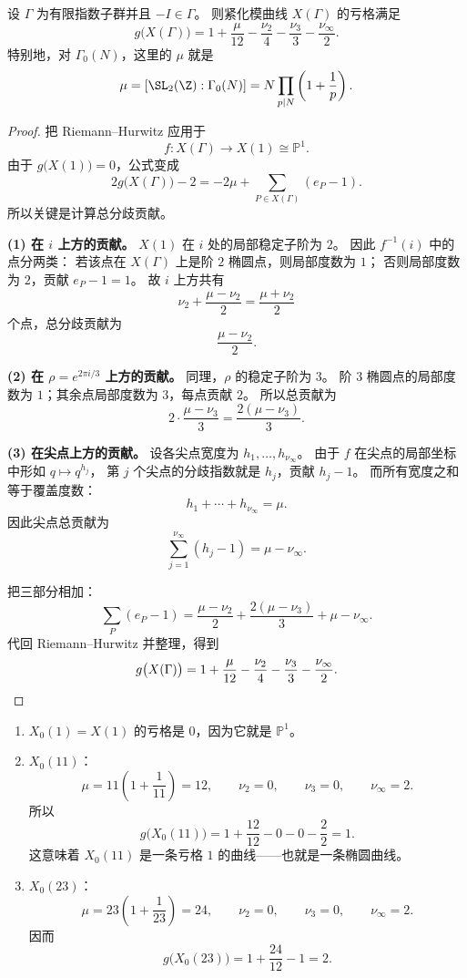 \begin{theorem}
\label{thm:genus-formula-modular-curves}
设 $\Gamma$ 为有限指数子群并且 $-I\in\Gamma$。
则紧化模曲线 $X(\Gamma)$ 的亏格满足
\[
  g\bigl(X(\Gamma)\bigr)
  =1+\frac{\mu}{12}-\frac{\nu_2}{4}-\frac{\nu_3}{3}-\frac{\nu_\infty}{2}.
\]
特别地，对 $\Gamma_0(N)$，这里的 $\mu$ 就是
\[
  \mu=[\SL_2(\Z):\Gamma_0(N)]=N\prod_{p\mid N}\left(1+\frac1p\right).
\]
\end{theorem}

\begin{proof}
把 Riemann--Hurwitz 应用于
\[
  f\colon X(\Gamma)\longrightarrow X(1)\cong\mathbb{P}^1.
\]
由于 $g\bigl(X(1)\bigr)=0$，公式变成
\[
  2g\bigl(X(\Gamma)\bigr)-2=-2\mu+\sum_{P\in X(\Gamma)}(e_P-1).
\]
所以关键是计算总分歧贡献。

\textbf{(1) 在 $i$ 上方的贡献。}
$X(1)$ 在 $i$ 处的局部稳定子阶为 $2$。
因此 $f^{-1}(i)$ 中的点分两类：
若该点在 $X(\Gamma)$ 上是阶 $2$ 椭圆点，则局部度数为 $1$；
否则局部度数为 $2$，贡献 $e_P-1=1$。
故 $i$ 上方共有
\[
  \nu_2+\frac{\mu-\nu_2}{2}=\frac{\mu+\nu_2}{2}
\]
个点，总分歧贡献为
\[
  \frac{\mu-\nu_2}{2}.
\]

\textbf{(2) 在 $\rho=e^{2\pi i/3}$ 上方的贡献。}
同理，$\rho$ 的稳定子阶为 $3$。
阶 $3$ 椭圆点的局部度数为 $1$；其余点局部度数为 $3$，每点贡献 $2$。
所以总贡献为
\[
  2\cdot\frac{\mu-\nu_3}{3}=\frac{2(\mu-\nu_3)}{3}.
\]

\textbf{(3) 在尖点上方的贡献。}
设各尖点宽度为 $h_1,\dots,h_{\nu_\infty}$。
由于 $f$ 在尖点的局部坐标中形如 $q\mapsto q^{h_j}$，
第 $j$ 个尖点的分歧指数就是 $h_j$，贡献 $h_j-1$。
而所有宽度之和等于覆盖度数：
\[
  h_1+\cdots+h_{\nu_\infty}=\mu.
\]
因此尖点总贡献为
\[
  \sum_{j=1}^{\nu_\infty}(h_j-1)=\mu-\nu_\infty.
\]

把三部分相加：
\[
  \sum_P(e_P-1)=\frac{\mu-\nu_2}{2}+\frac{2(\mu-\nu_3)}{3}+\mu-\nu_\infty.
\]
代回 Riemann--Hurwitz 并整理，得到
\[
  g\bigl(X(\Gamma)\bigr)
  =1+\frac{\mu}{12}-\frac{\nu_2}{4}-\frac{\nu_3}{3}-\frac{\nu_\infty}{2}.
\qedhere
\]
\end{proof}

\begin{example}[三个最重要的例子]
\label{ex:genus-small-levels}
\begin{enumerate}
  \item $X_0(1)=X(1)$ 的亏格是 $0$，因为它就是 $\mathbb{P}^1$。
  \item $X_0(11)$：
    \[
      \mu=11\left(1+\frac1{11}\right)=12,
      \qquad \nu_2=0,
      \qquad \nu_3=0,
      \qquad \nu_\infty=2.
    \]
    所以
    \[
      g\bigl(X_0(11)\bigr)=1+\frac{12}{12}-0-0-\frac22=1.
    \]
    这意味着 $X_0(11)$ 是一条亏格 $1$ 的曲线——也就是一条椭圆曲线。
  \item $X_0(23)$：
    \[
      \mu=23\left(1+\frac1{23}\right)=24,
      \qquad \nu_2=0,
      \qquad \nu_3=0,
      \qquad \nu_\infty=2.
    \]
    因而
    \[
      g\bigl(X_0(23)\bigr)=1+\frac{24}{12}-1=2.
    \]
\end{enumerate}
\end{example}

